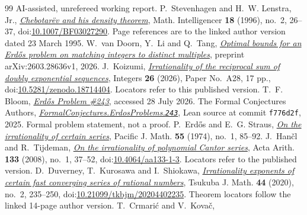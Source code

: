 \begin{thebibliography}{99}
  AI-assisted, unrefereed working report.
 P.~Stevenhagen and H.~W. Lenstra, Jr.,
  \href{https://pub.math.leidenuniv.nl/~lenstrahw/PUBLICATIONS/1994c/art.pdf}
  {\emph{Chebotar\"ev and his density theorem}}, Math. Intelligencer
  \textbf{18} (1996), no.~2, 26--37,
  doi:\href{https://doi.org/10.1007/BF03027290}{10.1007/BF03027290}.
  Page references are to the linked author version dated 23 March 1995.
 W.~van Doorn, Y.~Li and Q.~Tang,
  \href{https://arxiv.org/abs/2603.28636}{\emph{Optimal bounds for an
  Erd\H{o}s problem on matching integers to distinct multiples}},
  preprint arXiv:2603.28636v1, 2026.
 J.~Koizumi,
  \href{https://math.colgate.edu/~integers/aa28/aa28.pdf}
  {\emph{Irrationality of the reciprocal sum of doubly exponential sequences}},
  Integers \textbf{26} (2026), Paper No.~A28, 17 pp.,
  doi:\href{https://doi.org/10.5281/zenodo.18714404}{10.5281/zenodo.18714404}.
  Locators refer to this published version.
 T.~F. Bloom,
  \href{https://www.erdosproblems.com/243}{\emph{Erd\H{o}s Problem \#243}},
  accessed 28 July 2026.
 The Formal Conjectures Authors,
  \href{https://github.com/google-deepmind/formal-conjectures/blob/f776d2f2039351b00737ffcafb9d7d7666e1d9af/FormalConjectures/ErdosProblems/243.lean}
  {\emph{FormalConjectures.ErdosProblems.\texttt{243}}},
  Lean source at commit \texttt{f776d2f}, 2025. Formal problem statement,
  not a proof.
 P.~Erd\H{o}s and E.~G. Straus,
  \href{https://msp.org/pjm/1974/55-1/pjm-v55-n1-p08-s.pdf}
  {\emph{On the irrationality of certain series}}, Pacific J. Math.
  \textbf{55} (1974), no.~1, 85--92.
 J.~Han\v{c}l and R.~Tijdeman,
  \href{https://www.impan.pl/shop/en/publication/transaction/download/product/82186}
  {\emph{On the irrationality of polynomial Cantor series}},
  Acta Arith. \textbf{133} (2008), no.~1, 37--52,
  doi:\href{https://doi.org/10.4064/aa133-1-3}{10.4064/aa133-1-3}.
  Locators refer to the published version.
 D.~Duverney, T.~Kurosawa and I.~Shiokawa,
  \href{https://danielduverney.fr/documents/theorie-des-nombres/Tsukuba.pdf}
  {\emph{Irrationality exponents of certain fast converging series of rational
  numbers}}, Tsukuba J. Math. \textbf{44} (2020), no.~2, 235--250,
  doi:\href{https://doi.org/10.21099/tkbjm/20204402235}{10.21099/tkbjm/20204402235}.
  Theorem locators follow the linked 14-page author version.
 T.~Crmari\'{c} and V.~Kova\v{c},

\end{thebibliography}
